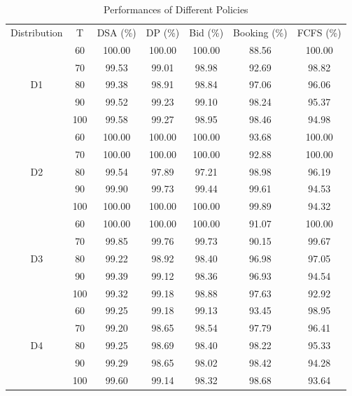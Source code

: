 \begin{table}[h]
  \centering
  \caption{Performances of Different Policies}
  \begin{tabular}{ccccccc}
  \hline
  Distribution & T & DSA (\%) & DP (\%) & Bid (\%) & Booking (\%) & FCFS (\%) \\
  \cmidrule(r){0-1} \cmidrule(lr){3-3} \cmidrule(lr){4-4} \cmidrule(lr){5-5} \cmidrule(lr){6-6} \cmidrule(l){7-7}
  \multirow{5}{*}{D1} & 60 & 100.00 & 100.00 & 100.00 & 88.56 & 100.00 \\
  & 70    & 99.53 & 99.01 & 98.98 & 92.69 & 98.82 \\
  & 80    & 99.38 & 98.91 & 98.84 & 97.06 & 96.06 \\
  & 90    & 99.52 & 99.23 & 99.10 & 98.24 & 95.37 \\
  & 100   & 99.58 & 99.27 & 98.95 & 98.46 & 94.98 \\
  \hline
  \multirow{5}{*}{D2} & 60  & 100.00 & 100.00 & 100.00 & 93.68 & 100.00 \\
     & 70  & 100.00 & 100.00 & 100.00 & 92.88 & 100.00 \\
     & 80  & 99.54 & 97.89 & 97.21 & 98.98 & 96.19 \\
     & 90  & 99.90 & 99.73 & 99.44 & 99.61 & 94.53 \\
     & 100 & 100.00 & 100.00 & 100.00 & 99.89 & 94.32 \\ 
  \hline
  \multirow{5}{*}{D3} & 60  & 100.00 & 100.00 & 100.00 & 91.07 & 100.00 \\
  & 70  & 99.85 & 99.76 & 99.73 & 90.15 & 99.67 \\
  & 80  & 99.22 & 98.92 & 98.40 & 96.98 & 97.05 \\
  & 90  & 99.39 & 99.12 & 98.36 & 96.93 & 94.54 \\
  & 100  & 99.32 & 99.18 & 98.88 & 97.63 & 92.92 \\
    \hline
    \multirow{5}{*}{D4} & 60  & 99.25 & 99.18 & 99.13 & 93.45 & 98.95 \\
     & 70  & 99.20 & 98.65 & 98.54 & 97.79 & 96.41 \\
     & 80  & 99.25 & 98.69 & 98.40 & 98.22 & 95.33 \\
     & 90  & 99.29 & 98.65 & 98.02 & 98.42 & 94.28 \\
     & 100 & 99.60 & 99.14 & 98.32 & 98.68 & 93.64 \\
  \hline
  \end{tabular}
\end{table}


